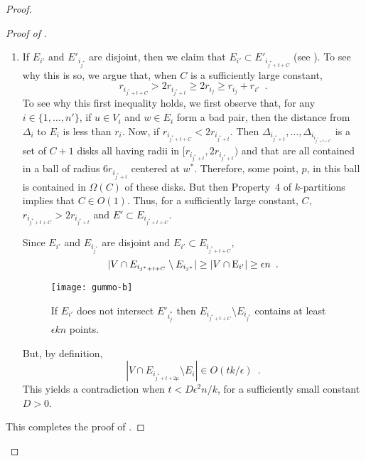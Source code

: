 \documentclass{patmorin}
\begin{document}
\begin{proof}
\begin{proof}[Proof of ]
\begin{enumerate}
    \item If $E_{i'}$ and $E'_{i_{j^*}}$ are disjoint, then we claim that
    $E_{i'}\subset E'_{i_{j^*+t+C}}$ (see ).  To see why
    this is so, we argue that, when $C$ is a sufficiently large constant,
    \[
      r_{i_{j^*+t+C}} > 2r_{i_{j^*+t}} 
          \ge 2r_{i_j} \ge r_{i_j} + r_{i'} \enspace .
    \]  
    To see why this first inequality holds, we first observe
    that, for any $i\in\{1,\ldots,n'\}$, if $u\in V_i$ and $w\in E_i$
    form a bad pair, then the distance from $\Delta_i$ to $E_i$ is less
    than $r_i$.  Now, if $r_{i_{j^*+t+C}} < 2r_{i_{j^*+t}}$.
    Then $\Delta_{i_{j^*+t}},\ldots,\Delta_{i_{i_{j^*+t+C}}}$ is a set
    of $C+1$ disks all having radii in $[r_{i_{j^*+t}},2r_{i_{j^*+t}})$ and
    that are all contained in a ball of radius $6r_{i_{j^*+t}}$ centered
    at $w^*$.  Therefore, some point, $p$, in this ball is contained in
    $\Omega(C)$ of these disks.  But then Property~4 of $k$-partitions
    implies that $C\in O(1)$.  Thus, for a sufficiently large constant, $C$,
    $r_{i_{j^*+t+C}} > 2r_{i_{j^*+t}}$ and $E'\subset E_{i_{j^*+t+C}}$.

    Since $E_{i'}$ and $E_{i_{j^*}}$ are disjoint and $E_{i'}\subset
    E_{i_{j^*+t+C}}$,
    \[
      |V\cap E_{i_{j^*+t+C}}\setminus E_{i_{j^*}}| 
         \ge |V\cap\mathrm{E}_{i'}| \ge \epsilon n \enspace .
    \]
    \begin{figure}
      \begin{center}
        \texttt{[image: gummo-b]}
        \caption{If $E_{i'}$ does not intersect $E'_{i_j^*}$ then
          $E_{i_{j^*+t+C}}\setminus E_{i_{j^*}}$ contains at least
          $\epsilon kn$ points.}
      \end{center}
    \end{figure}
    But, by definition, 
    \[
      |V\cap E_{i_{j^*+t+2\mu}}\setminus E_i| 
         \in O(tk/\epsilon) \enspace .
    \]
    This yields a contradiction when $t<D \epsilon^2 n/k$, for a
    sufficiently small constant $D>0$.
  \end{enumerate}
  This completes the proof of .
  \end{proof}



\end{proof}
\end{document}
